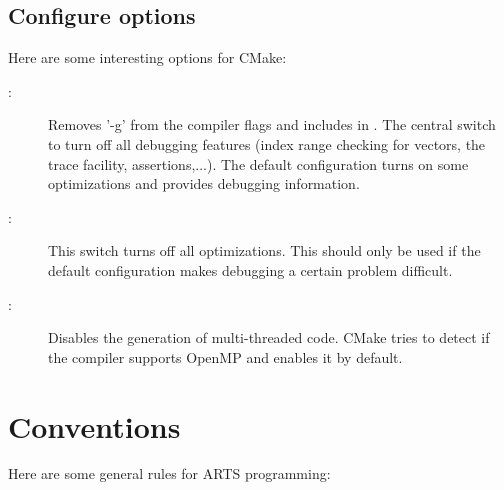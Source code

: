 \subsection{Configure options}

Here are some interesting options for CMake:

\begin{description}
\item[:] Removes '-g' from
the compiler flags and includes  in
. The central switch to turn off all debugging
features (index range checking for vectors, the trace facility,
assertions,...). The default configuration 
turns on some optimizations and provides debugging information.

\item[:] This switch turns off all
optimizations. This should only be used if the default configuration
makes debugging a certain problem difficult.

\item[:] 
Disables the generation of multi-threaded code. CMake tries to detect if the compiler supports OpenMP and enables it by default.

\end{description}


%

\section{Conventions}
\label{sec:development:conv}

Here are some general rules for ARTS programming:

